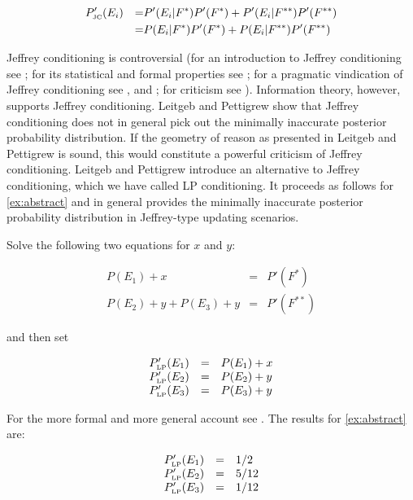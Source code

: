 \documentclass[11pt]{article}
\begin{document}
\begin{align}
  \label{eq:jc}
  &P'_{\mbox{\tiny JC}}(E_{i})&=&P'(E_{i}|F^{*})P'(F^{*})+P'(E_{i}|F^{**})P'(F^{**})\notag \\
  &&=&P(E_{i}|F^{*})P'(F^{*})+P(E_{i}|F^{**})P'(F^{**})
\end{align}

Jeffrey conditioning is controversial (for an introduction to Jeffrey
conditioning see ; for its statistical and
formal properties see ; for a pragmatic
vindication of Jeffrey conditioning see , and
; for criticism see
). Information theory, however, supports
Jeffrey conditioning. Leitgeb and Pettigrew show that Jeffrey
conditioning does not in general pick out the minimally inaccurate
posterior probability distribution. If the geometry of reason as
presented in Leitgeb and Pettigrew is sound, this would constitute a
powerful criticism of Jeffrey conditioning. Leitgeb and Pettigrew
introduce an alternative to Jeffrey conditioning, which we have called
LP conditioning. It proceeds as follows for {\xample}
\ref{ex:abstract} and in general provides the minimally inaccurate
posterior probability distribution in Jeffrey-type updating scenarios.

Solve the following two equations for $x$ and $y$:

\begin{equation}
  \label{eq:lpce}
  \begin{array}{rcl}
    P(E_{1})+x&=&P'(F^{*}) \\
    P(E_{2})+y+P(E_{3})+y&=&P'(F^{**})
  \end{array}
\end{equation}

and then set

\begin{equation}
  \label{eq:lpcf}
  \begin{array}{rcl}
    P'_{\mbox{\tiny LP}}(E_{1})&=&P(E_{1})+x \\
    P'_{\mbox{\tiny LP}}(E_{2})&=&P(E_{2})+y \\
    P'_{\mbox{\tiny LP}}(E_{3})&=&P(E_{3})+y
  \end{array}
\end{equation}

For the more formal and more general account see
. The results for {\xample}
\ref{ex:abstract} are:

\begin{equation}
  \label{eq:lpcres}
  \begin{array}{rcl}
    P'_{\mbox{\tiny LP}}(E_{1})&=&1/2 \\
    P'_{\mbox{\tiny LP}}(E_{2})&=&5/12 \\
    P'_{\mbox{\tiny LP}}(E_{3})&=&1/12
  \end{array}
\end{equation}
\end{document}
